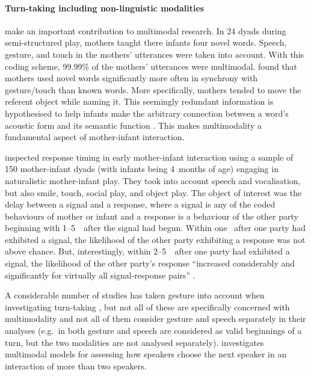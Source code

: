 \paragraph{Turn-taking including non-linguistic modalities}
\citet{gogate_study_2000} make an important contribution to multimodal research.
In 24 dyads during semi-structured play, mothers taught there infants four novel words.
Speech, gesture, and touch in the mothers' utterances were taken into account.
With this coding scheme, 99.99\% of the mothers' utterances were multimodal.
\citet{gogate_study_2000} found that mothers used novel words significantly more often in synchrony with gesture/touch than known words.
More specifically, mothers tended to move the referent object while naming it.
This seemingly redundant information is hypothesised to help infants make the arbitrary connection between a word's acoustic form and its semantic function \citep[]{gogate_study_2000}.
This makes multimodality a fundamental aspect of mother-infant interaction.

\citet{vanegeren_mother-infant_2001} inspected response timing in early mother-infant interaction using a sample of 150 mother-infant dyads (with infants being 4~months of age) engaging in naturalistic mother-infant play.
They took into account speech and vocalisation, but also smile, touch, social play, and object play.
The object of interest was the delay between a signal and a response, where a signal is any of the coded behaviours of mother or infant and a response is a behaviour of the other party beginning with 1--5~\s\ after the signal had begun.
Within one \sone\ after one party had exhibited a signal, the likelihood of the other party exhibiting a response was not above chance.
But, interestingly, within 2--5~\s\ after one party had exhibited a signal, the likelihood of the other party's response ``increased considerably and significantly for virtually all signal-response pairs'' \citep[]{vanegeren_mother-infant_2001}.

A considerable number of studies has taken gesture into account when investigating turn-taking \citep[among others]{benus_pragmatic_2011,mccowan_automatic_2005,schmitt_zur_2005,stivers_universals_2009}, but not all of these are specifically concerned with multimodality and not all of them consider gesture and speech separately in their analyses (e.g.~in \citet{stivers_universals_2009} both gesture and speech are considered as valid beginnings of a turn, but the two modalities are not analysed separately).
\citet{mondada_participants_2006,mondada_multimodal_2007} investigates multimodal models for assessing how speakers choose the next speaker in an interaction of more than two speakers.

